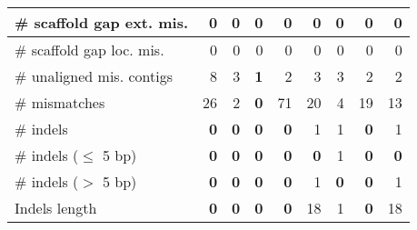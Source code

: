 \documentclass[12pt,a4paper]{article}
\begin{document}
\begin{table}[ht]
\begin{center}
\begin{tabular}{|l*{8}{|r}|}
\# scaffold gap ext. mis. & 0 & 0 & 0 & 0 & 0 & 0 & 0 & 0 \\ \hline
\# scaffold gap loc. mis. & 0 & 0 & 0 & 0 & 0 & 0 & 0 & 0 \\ \hline
\# unaligned mis. contigs & 8 & 3 & {\bf 1} & 2 & 3 & 3 & 2 & 2 \\ \hline
\# mismatches & 26 & 2 & {\bf 0} & 71 & 20 & 4 & 19 & 13 \\ \hline
\# indels & {\bf 0} & {\bf 0} & {\bf 0} & {\bf 0} & 1 & 1 & {\bf 0} & 1 \\ \hline
\hspace{5mm}\# indels ($\leq$ 5 bp) & {\bf 0} & {\bf 0} & {\bf 0} & {\bf 0} & {\bf 0} & 1 & {\bf 0} & {\bf 0} \\ \hline
\hspace{5mm}\# indels ($>$ 5 bp) & {\bf 0} & {\bf 0} & {\bf 0} & {\bf 0} & 1 & {\bf 0} & {\bf 0} & 1 \\ \hline
Indels length & {\bf 0} & {\bf 0} & {\bf 0} & {\bf 0} & 18 & 1 & {\bf 0} & 18 \\ \hline
\end{tabular}
\end{center}
\end{table}
\end{document}
